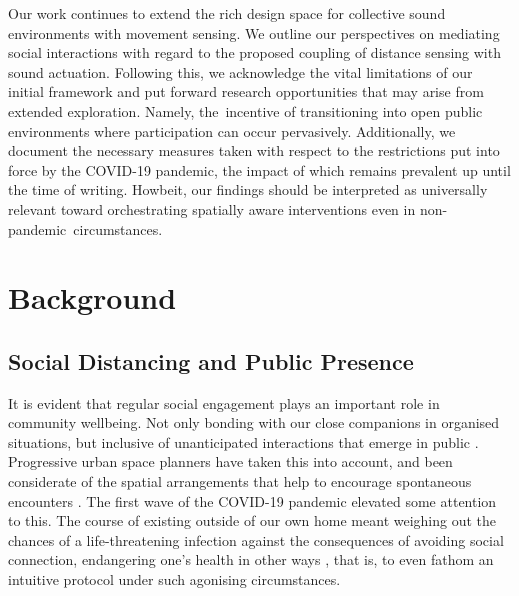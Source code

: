 {Our work continues to extend the rich design space for collective sound environments with movement sensing. We outline our perspectives on mediating social interactions with regard to the proposed coupling of distance sensing with sound actuation. Following this, we acknowledge the vital limitations of our initial framework and put forward research opportunities that may arise from extended exploration. Namely, the~incentive of transitioning into open public environments where participation can occur pervasively. Additionally, we document the necessary measures taken with respect to the restrictions put into force by the COVID-19 pandemic, the impact of which remains prevalent up until the time of writing. Howbeit, our findings should be interpreted as universally relevant toward orchestrating spatially aware interventions even in non-pandemic~circumstances.

\section{Background}
\label{sec2:Background}

\subsection*{Social Distancing and Public Presence}
\label{subsec:public_space}

It is evident that regular social engagement plays an important role in community wellbeing. Not only bonding with our close companions in organised situations, but inclusive of unanticipated interactions that emerge in public \citep{ang_your_2021,simoes_aelbrecht_rethinking_2010,sugiyama_associations_2008}. Progressive urban space planners have taken this into account, and been considerate of the spatial arrangements that help to encourage spontaneous encounters \citep{latham_social_2019,okkels_urban_2018,mehta_look_2009}. The first wave of the COVID-19 pandemic elevated some attention to this. The course of existing outside of our own home meant weighing out the chances of a life-threatening infection against the consequences of avoiding social connection, endangering one's health in other ways \citep{brooks_psychological_2020,rivera_effects_2020,zorzo_adult_2019,evans_social_2019}, that is, to even fathom an intuitive protocol under such agonising circumstances.

}
